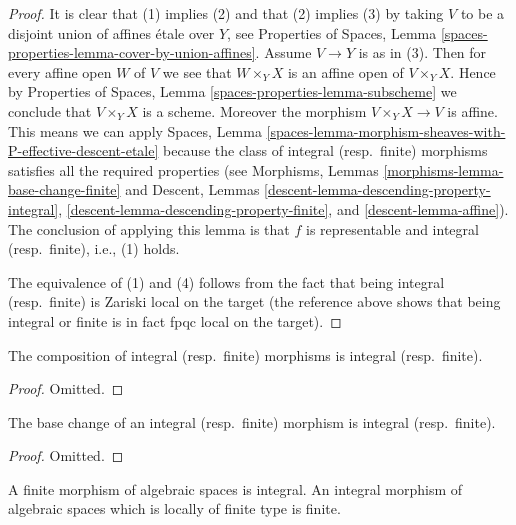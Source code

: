\begin{proof}
It is clear that (1) implies (2) and that (2) implies (3) by taking
$V$ to be a disjoint union of affines \'etale over $Y$, see
Properties of Spaces,
Lemma \ref{spaces-properties-lemma-cover-by-union-affines}.
Assume $V \to Y$ is as in (3). Then for every affine open $W$ of $V$ we see
that $W \times_Y X$ is an affine open of $V \times_Y X$. Hence by
Properties of Spaces, Lemma \ref{spaces-properties-lemma-subscheme}
we conclude that $V \times_Y X$ is a scheme. Moreover the morphism
$V \times_Y X \to V$ is affine. This means we can apply
Spaces,
Lemma \ref{spaces-lemma-morphism-sheaves-with-P-effective-descent-etale}
because the class of integral (resp.\ finite) morphisms
satisfies all the required properties (see
Morphisms, Lemmas \ref{morphisms-lemma-base-change-finite} and
Descent, Lemmas
\ref{descent-lemma-descending-property-integral},
\ref{descent-lemma-descending-property-finite},
and \ref{descent-lemma-affine}).
The conclusion of applying this lemma is that $f$ is representable
and integral (resp.\ finite), i.e., (1) holds.

\medskip\noindent
The equivalence of (1) and (4) follows from the fact that being
integral (resp.\ finite) is Zariski local on the target (the
reference above shows that being integral or finite is in fact
fpqc local on the target).
\end{proof}

\begin{lemma}
\label{lemma-composition-integral}
The composition of integral (resp.\ finite) morphisms is integral
(resp.\ finite).
\end{lemma}

\begin{proof}
Omitted.
\end{proof}

\begin{lemma}
\label{lemma-base-change-integral}
The base change of an integral (resp.\ finite) morphism is integral
(resp.\ finite).
\end{lemma}

\begin{proof}
Omitted.
\end{proof}

\begin{lemma}
\label{lemma-finite-integral}
A finite morphism of algebraic spaces is integral.
An integral morphism of algebraic spaces
which is locally of finite type is finite.
\end{lemma}

